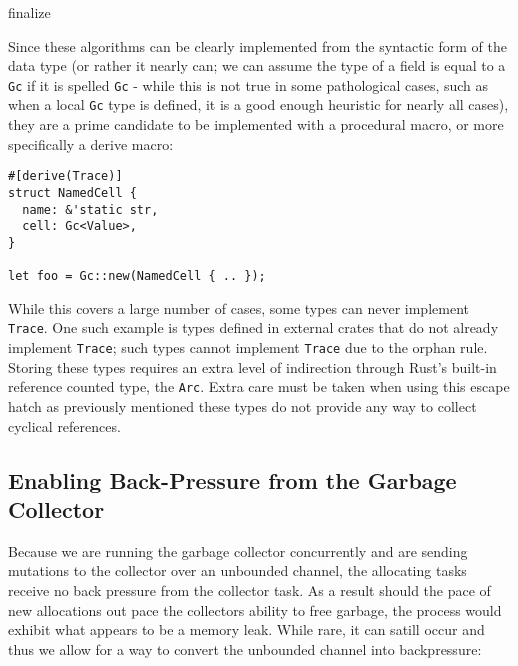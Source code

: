 \documentclass[sigplan,authordraft]{acmart}
\begin{document}
\begin{algorithm}
  \caption{finalize}\label{alg:cap}

\end{algorithm}

Since these algorithms can be clearly implemented from the syntactic form of the
data type (or rather it nearly can; we can assume the type of a field is equal to
a \texttt{Gc} if it is spelled \texttt{Gc} - while this is not true in some
pathological cases, such as when a local \texttt{Gc} type is defined, it is a
good enough heuristic for nearly all cases), they are a prime candidate to be
implemented with a procedural macro, or more specifically a derive
macro\cite{derive}:

\begin{verbatim}
#[derive(Trace)]
struct NamedCell {
  name: &'static str,
  cell: Gc<Value>,
}

let foo = Gc::new(NamedCell { .. });
\end{verbatim}

While this covers a large number of cases, some types can never implement
\texttt{Trace}. One such example is types defined in external crates that do not
already implement \texttt{Trace}; such types cannot implement \texttt{Trace} due
to the orphan rule\cite{orphan}. Storing these types requires an extra level of
indirection through Rust's built-in reference counted type, the
\texttt{Arc}\cite{arc}. Extra care must be taken when using this escape hatch as
previously mentioned these types do not provide any way to collect cyclical
references.

\subsection{Enabling Back-Pressure from the Garbage Collector}

Because we are running the garbage collector concurrently and are sending
mutations to the collector over an unbounded channel, the allocating tasks
receive no back pressure from the collector task. As a result should the pace
of new allocations out pace the collectors ability to free garbage, the process
would exhibit what appears to be a memory leak. While rare, it can satill occur
and thus we allow for a way to convert the unbounded channel into backpressure:
\end{document}
